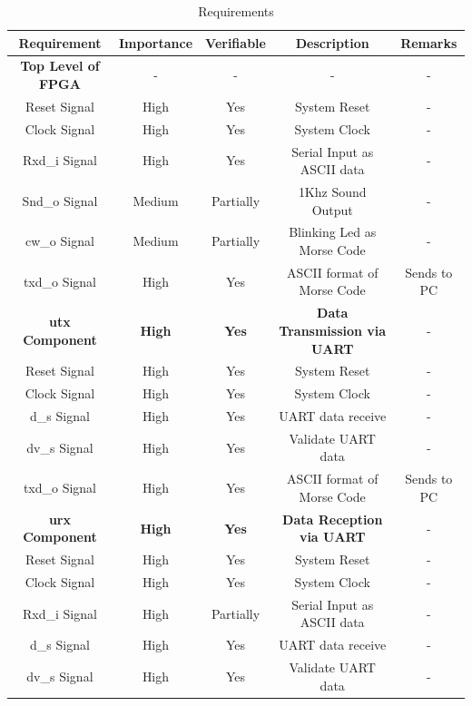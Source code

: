 \documentclass[12pt,a4paper, landscape]{article}
\begin{document}
\begin{table}[h!]
\centering
\begin{tabular}{|c||c|c|c|c|} 
 \hline
 \textbf{Requirement} & \textbf{Importance}& \textbf{Verifiable} & \textbf{Description} & \textbf{Remarks} \\ [0.5ex] 
 \hline
  \textbf{Top Level of FPGA} & - & - & - & -\\ [0.5ex]
 \hline
  Reset Signal & High & Yes & System Reset & -\\ [0.5ex] 
 \hline
 Clock Signal & High & Yes & System Clock & - \\ [0.5ex] 
 \hline
 Rxd\_i Signal & High & Yes & Serial Input as ASCII data & - \\ [0.5ex] 
 \hline
  Snd\_o Signal & Medium & Partially & 1Khz Sound Output  & - \\ [0.5ex] 
 \hline
  cw\_o Signal & Medium & Partially & Blinking Led as Morse Code & - \\ [0.5ex] 
 \hline
  txd\_o Signal & High & Yes & ASCII format of Morse Code & Sends to PC \\[0.5ex] 
 \hline
 \textbf{utx Component} & \textbf{High} & \textbf{Yes} & \textbf{Data Transmission via UART} & - \\[0.5ex] 
 \hline
  Reset Signal & High & Yes & System Reset & -\\ [0.5ex] 
 \hline
 Clock Signal & High & Yes & System Clock & - \\ [0.5ex] 
 \hline
 d\_s Signal & High & Yes & UART data receive & - \\ [0.5ex] 
 \hline
 dv\_s Signal & High & Yes & Validate UART data & - \\ [0.5ex] 
 \hline
  txd\_o Signal & High & Yes & ASCII format of Morse Code & Sends to PC \\[0.5ex] 
 \hline
  \textbf{urx Component} & \textbf{High} & \textbf{Yes} & \textbf{Data Reception via UART} & - \\[0.5ex] 
 \hline
  Reset Signal & High & Yes & System Reset & -\\ [0.5ex] 
 \hline
 Clock Signal & High & Yes & System Clock & - \\ [0.5ex] 
 \hline
 Rxd\_i Signal & High & Partially & Serial Input as ASCII data & - \\ [0.5ex]
 \hline
  d\_s Signal & High & Yes & UART data receive & - \\ [0.5ex] 
 \hline
 dv\_s Signal & High & Yes & Validate UART data & - \\ [0.5ex] 
 
 \hline
 
\end{tabular}
\caption{ Requirements }
\label{table:1}
\end{table}
\end{document}
